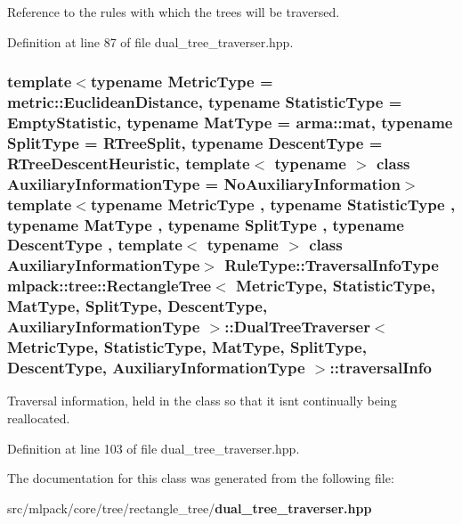 Reference to the rules with which the trees will be traversed. 



Definition at line 87 of file dual\+\_\+tree\+\_\+traverser.\+hpp.

\subsubsection[{traversal\+Info}]{\setlength{\rightskip}{0pt plus 5cm}template$<$typename Metric\+Type  = metric\+::\+Euclidean\+Distance, typename Statistic\+Type  = Empty\+Statistic, typename Mat\+Type  = arma\+::mat, typename Split\+Type  = R\+Tree\+Split, typename Descent\+Type  = R\+Tree\+Descent\+Heuristic, template$<$ typename $>$ class Auxiliary\+Information\+Type = No\+Auxiliary\+Information$>$ template$<$typename Metric\+Type , typename Statistic\+Type , typename Mat\+Type , typename Split\+Type , typename Descent\+Type , template$<$ typename $>$ class Auxiliary\+Information\+Type$>$ Rule\+Type\+::\+Traversal\+Info\+Type {\bf mlpack\+::tree\+::\+Rectangle\+Tree}$<$ Metric\+Type, Statistic\+Type, Mat\+Type, {\bf Split\+Type}, {\bf Descent\+Type}, Auxiliary\+Information\+Type $>$\+::{\bf Dual\+Tree\+Traverser}$<$ Metric\+Type, Statistic\+Type, Mat\+Type, {\bf Split\+Type}, {\bf Descent\+Type}, Auxiliary\+Information\+Type $>$\+::traversal\+Info\hspace{0.3cm}{\ttfamily [private]}}\label{classmlpack_1_1tree_1_1RectangleTree_1_1DualTreeTraverser_aa99ca1eb6bdb5e74d88f63a511e5bcf1}


Traversal information, held in the class so that it isn\textquotesingle{}t continually being reallocated. 



Definition at line 103 of file dual\+\_\+tree\+\_\+traverser.\+hpp.



The documentation for this class was generated from the following file\+:\begin{DoxyCompactItemize}
\item 
src/mlpack/core/tree/rectangle\+\_\+tree/{\bf dual\+\_\+tree\+\_\+traverser.\+hpp}\end{DoxyCompactItemize}
